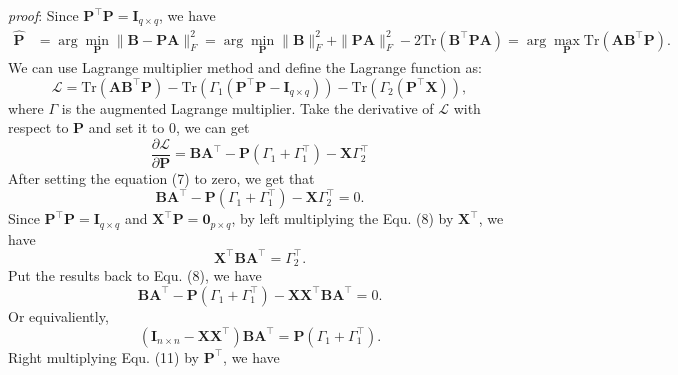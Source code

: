 \documentclass[titlepage,11pt,twoside]{article}
\begin{document}
\emph{proof}: 
Since $\mathbf{P}^{\top}\mathbf{P} = \mathbf{I}_{q\times q}$, we have
\begin{equation}
\begin{split}
\mathbf{\hat{P}}
&
=\arg\min_{\mathbf{P}}\|\mathbf{B}-\mathbf{P}\mathbf{A}\|_{F}^{2}
=\arg\min_{\mathbf{P}}\|\mathbf{B}\|_{F}^{2}+\|\mathbf{P}\mathbf{A}\|_{F}^{2}-2\text{Tr}(\mathbf{B}^{\top}\mathbf{P}\mathbf{A})
=\arg\max_{\mathbf{P}}\text{Tr}(\mathbf{A}\mathbf{B}^{\top}\mathbf{P}).
\end{split}
\end{equation}
We can use Lagrange multiplier method and define the Lagrange function as:
\begin{equation}
\mathcal{L}
=
\text{Tr}(\mathbf{A}\mathbf{B}^{\top}\mathbf{P})
-
\text{Tr}(\Gamma_{1}(\mathbf{P}^{\top}\mathbf{P} - \mathbf{I}_{q\times q}))
-
\text{Tr}(\Gamma_{2}(\mathbf{P}^{\top}\mathbf{X}))
,
\end{equation}
where $\Gamma$ is the augmented Lagrange multiplier. Take the derivative of $\mathcal{L}$ with respect to $\mathbf{P}$ and set it to 0, we can get
\begin{equation}
\frac{\partial \mathcal{L}}{\partial \mathbf{P}} 
=
\mathbf{B}\mathbf{A}^{\top}
-
\mathbf{P}(\Gamma_{1}+\Gamma_{1}^{\top})
-
\mathbf{X}\Gamma_{2}^{\top}
\end{equation}
After setting the equation (7) to zero, we get that
\begin{equation}
\mathbf{B}\mathbf{A}^{\top}
-
\mathbf{P}(\Gamma_{1}+\Gamma_{1}^{\top})
-
\mathbf{X}\Gamma_{2}^{\top}
=
0.
\end{equation}
Since $\mathbf{P}^{\top}\mathbf{P}=\mathbf{I}_{q\times q}$ and $\mathbf{X}^{\top}\mathbf{P} = \mathbf{0}_{p\times q}$, by left multiplying the Equ. (8) by $\mathbf{X}^{\top}$, we have 
\begin{equation}
\mathbf{X}^{\top}\mathbf{B}\mathbf{A}^{\top}
=
\Gamma_{2}^{\top}.
\end{equation}
Put the results back to Equ. (8), we have 
\begin{equation}
\mathbf{B}\mathbf{A}^{\top}
-
\mathbf{P}(\Gamma_{1}+\Gamma_{1}^{\top})
-
\mathbf{X}\mathbf{X}^{\top}\mathbf{B}\mathbf{A}^{\top}
=
0.
\end{equation}
Or equivaliently, 
\begin{equation}
(\mathbf{I}_{n\times n}-\mathbf{X}\mathbf{X}^{\top})\mathbf{B}\mathbf{A}^{\top}
=
\mathbf{P}(\Gamma_{1}+\Gamma_{1}^{\top}).
\end{equation}
Right multiplying Equ. (11) by $\mathbf{P}^{\top}$, we have
\end{document}
